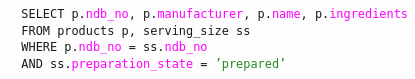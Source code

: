 \newcommand{\sqlcolor}[1]{\textcolor{Bittersweet}{#1}}
\newcommand{\fieldcolor}[1]{\textcolor{Fuchsia}{#1}}
\newcommand{\strcolor}[1]{\textcolor{ForestGreen}{#1}}
\newcommand{\numcolor}[1]{\textcolor{TealBlue}{#1}}

\begin{figure}[h]
    \texttt{
    \textcolor{white}{F}\sqlcolor{SELECT} p.\fieldcolor{ndb\_no}, p.\fieldcolor{manufacturer}, p.\fieldcolor{name}, p.\fieldcolor{ingredients} \\
    \textcolor{white}{FF}\sqlcolor{FROM} products p, serving\_size ss\\
    \textcolor{white}{FF}\sqlcolor{WHERE} p.\fieldcolor{ndb\_no} = ss.\fieldcolor{ndb\_no} \\ 
    \textcolor{white}{FF}\sqlcolor{AND} ss.\fieldcolor{preparation\_state} = \strcolor{'prepared'}
    }
\end{figure}
